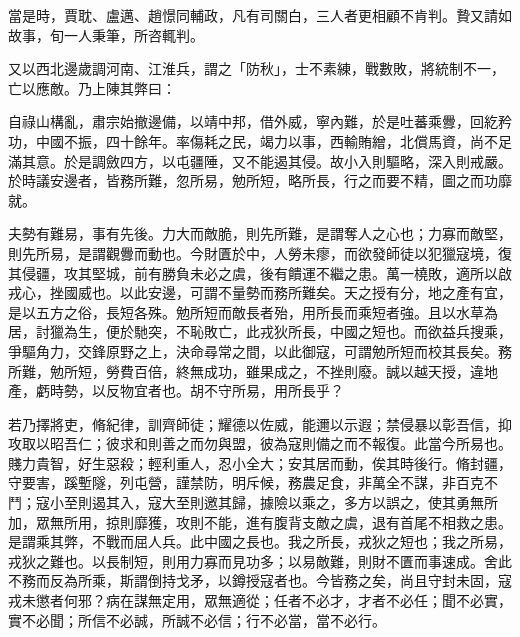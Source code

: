 \begin{pinyinscope}
 當是時，賈耽、盧邁、趙憬同輔政，凡有司關白，三人者更相顧不肯判。贄又請如故事，旬一人秉筆，所咨輒判。



 又以西北邊歲調河南、江淮兵，謂之「防秋」，士不素練，戰數敗，將統制不一，亡以應敵。乃上陳其弊曰：



 自祿山構亂，肅宗始撤邊備，以靖中邦，借外威，寧內難，於是吐蕃乘釁，回紇矜功，中國不振，四十餘年。率傷耗之民，竭力以事，西輸賄繒，北償馬資，尚不足滿其意。於是調斂四方，以屯疆陲，又不能遏其侵。故小入則驅略，深入則戒嚴。於時議安邊者，皆務所難，忽所易，勉所短，略所長，行之而要不精，圖之而功靡就。



 夫勢有難易，事有先後。力大而敵脆，則先所難，是謂奪人之心也；力寡而敵堅，則先所易，是謂觀釁而動也。今財匱於中，人勞未瘳，而欲發師徒以犯獵寇境，復其侵疆，攻其堅城，前有勝負未必之虞，後有饋運不繼之患。萬一橈敗，適所以啟戎心，挫國威也。以此安邊，可謂不量勢而務所難矣。天之授有分，地之產有宜，是以五方之俗，長短各殊。勉所短而敵長者殆，用所長而乘短者強。且以水草為居，討獵為生，便於馳突，不恥敗亡，此戎狄所長，中國之短也。而欲益兵搜乘，爭驅角力，交鋒原野之上，決命尋常之間，以此御寇，可謂勉所短而校其長矣。務所難，勉所短，勞費百倍，終無成功，雖果成之，不挫則廢。誠以越天授，違地產，虧時勢，以反物宜者也。胡不守所易，用所長乎？



 若乃擇將吏，脩紀律，訓齊師徒；耀德以佐威，能邇以示遐；禁侵暴以彰吾信，抑攻取以昭吾仁；彼求和則善之而勿與盟，彼為寇則備之而不報復。此當今所易也。賤力貴智，好生惡殺；輕利重人，忍小全大；安其居而動，俟其時後行。脩封疆，守要害，蹊塹隧，列屯營，謹禁防，明斥候，務農足食，非萬全不謀，非百克不鬥；寇小至則遏其入，寇大至則邀其歸，據險以乘之，多方以誤之，使其勇無所加，眾無所用，掠則靡獲，攻則不能，進有腹背支敵之虞，退有首尾不相救之患。是謂乘其弊，不戰而屈人兵。此中國之長也。我之所長，戎狄之短也；我之所易，戎狄之難也。以長制短，則用力寡而見功多；以易敵難，則財不匱而事速成。舍此不務而反為所乘，斯謂倒持戈矛，以鐏授寇者也。今皆務之矣，尚且守封未固，寇戎未懲者何邪？病在謀無定用，眾無適從；任者不必才，才者不必任；聞不必實，實不必聞；所信不必誠，所誠不必信；行不必當，當不必行。




\end{pinyinscope}
